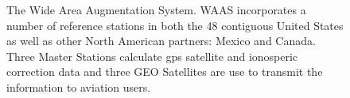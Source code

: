\begin{figure}
	\centering
	\caption{The Wide Area Augmentation System.  WAAS incorporates a number of reference stations in both the 48 contiguous United States as well as other North American partners: Mexico and Canada.  Three Master Stations calculate \ac{gps} satellite and ionosperic correction data and three GEO Satellites are use to transmit the information to aviation users.}
	\label{fig:WAAS-Overview-1}
\end{figure}


